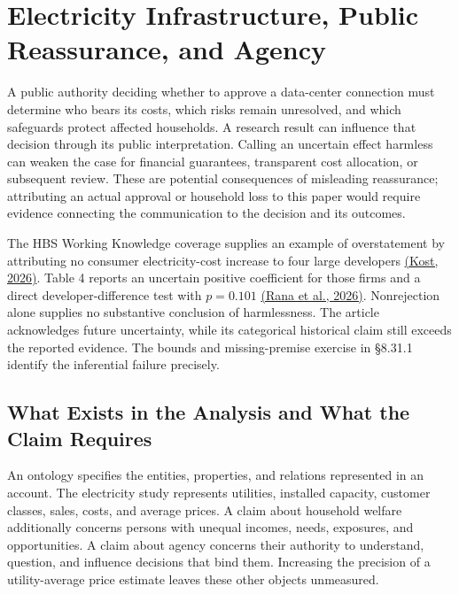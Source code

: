 
\hypertarget{M09-electricity-infrastructure-public-reassurance-and-agency}{%
\section{Electricity Infrastructure, Public Reassurance, and
Agency}\label{M09-electricity-infrastructure-public-reassurance-and-agency}}

\noindent \noindent A public authority deciding whether to approve a data-center
connection must determine who bears its costs, which risks remain
unresolved, and which safeguards protect affected households. A research
result can influence that decision through its public interpretation.
Calling an uncertain effect harmless can weaken the case for financial
guarantees, transparent cost allocation, or subsequent review. These are
potential consequences of misleading reassurance; attributing an actual
approval or household loss to this paper would require evidence
connecting the communication to the decision and its outcomes.

The HBS Working Knowledge coverage supplies an example of overstatement
by attributing no consumer electricity-cost increase to four large
developers
\href{https://www.library.hbs.edu/working-knowledge/blaming-data-centers-for-higher-electric-bills-its-not-that-simple}{(Kost,
2026)}. Table 4 reports an uncertain positive coefficient for those
firms and a direct developer-difference test with \(p=0.101\)
\href{../01_Resources/41_Statistical_Claims_and_Decisions/RanaKapsNetessine_WorkingPaper2026.pdf}{(Rana
et al., 2026)}. Nonrejection alone supplies no substantive conclusion of
harmlessness. The article acknowledges future uncertainty, while its
categorical historical claim still exceeds the reported evidence. The
bounds and missing-premise exercise in §8.31.1 identify the inferential
failure precisely.

\hypertarget{M09-what-exists-in-the-analysis-and-what-the-claim-requires}{%
\subsection{What Exists in the Analysis and What the Claim
Requires}\label{M09-what-exists-in-the-analysis-and-what-the-claim-requires}}

\noindent \noindent An ontology specifies the entities, properties, and relations
represented in an account. The electricity study represents utilities,
installed capacity, customer classes, sales, costs, and average prices.
A claim about household welfare additionally concerns persons with
unequal incomes, needs, exposures, and opportunities. A claim about
agency concerns their authority to understand, question, and influence
decisions that bind them. Increasing the precision of a utility-average
price estimate leaves these other objects unmeasured.

